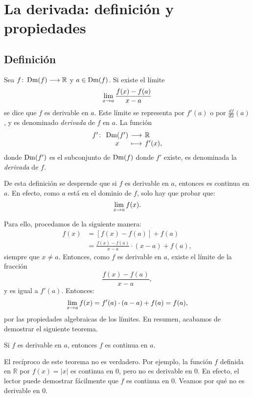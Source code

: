 \chapter{La derivada: definición y propiedades}

\section{Definición}
\begin{defical}\label{et:ddDefinicionDerivada}%
Sea $\funcjc{f}{\Dm(f)}{\mathbb{R}}$ y $a\in\Dm(f)$. Si
existe el límite
\begin{equation}
\label{eq:ddDefinicionDerivada}
\limjc{\frac{f(x) - f(a)}{x-a}}{x}{a}
\end{equation}
se dice que $f$ es derivable en $a$. Este límite se representa por $f'(a)$ o por
$\frac{df}{dx}(a)$, y es denominado \emph{derivada} de $f$ en $a$. La función
\[
\funcionjc{f'}{\Dm(f')}{\mathbb{R}}{x}{f'(x),}
\]
donde $\Dm(f')$ es el subconjunto de $\Dm(f)$ donde $f'$ existe, es denominada la \emph{derivada}
de $f$.
\end{defical}

De esta definición se desprende que si $f$ es derivable en $a$, entonces es continua en $a$. En
efecto, como $a$ está en el dominio de $f$, solo hay que probar que:
\[
\limjc{f(x)}{x}{a}.
\]

Para ello, procedamos de la siguiente manera:
\begin{align*}
f(x) &= [f(x) - f(a)] + f(a) \\[4pt]
  &= \frac{f(x) - f(a)}{x - a}\cdot (x - a) + f(a),
\end{align*}
siempre que $x\neq a$. Entonces, como $f$ es derivable en $a$, existe el límite de la fracción
\[
\frac{f(x) - f(a)}{x - a},
\]
y es igual a $f'(a)$. Entonces:
\[
\limjc{f(x)}{x}{a} = f'(a)\cdot (a - a) + f(a) = f(a),
\]
por las propiedades algebraicas de los límites. En resumen, acabamos de demostrar el siguiente
teorema.

\begin{teocal}\label{et:ddDerivadaContinua}%
Si $f$ es derivable en $a$, entonces $f$ es continua en $a$.
\end{teocal}

El recíproco de este teorema no es verdadero. Por ejemplo, la función $f$ definida en $\mathbb{R}$
por $f(x) = |x|$ es continua en $0$, pero no es derivable en $0$. En efecto, el lector puede
demostrar fácilmente que $f$ es continua en $0$. Veamos por qué no es derivable en $0$.

